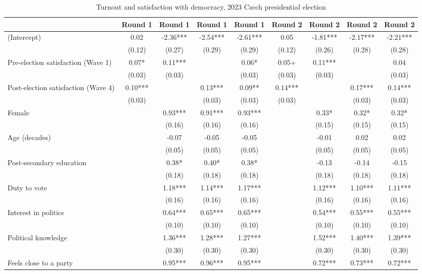 \begin{table}

\caption{\label{tab:unnamed-chunk-4}Turnout and satisfaction with democracy, 2023 Czech presidential election}
\centering
\begin{tabular}[t]{lcccccccc}
\toprule
  & Round 1 & Round 1  & Round 1   & Round 1    & Round 2 & Round 2  & Round 2   & Round 2   \\
\midrule
(Intercept) & 0.02 & -2.36*** & -2.54*** & -2.61*** & 0.05 & -1.81*** & -2.17*** & -2.21***\\
 & (0.12) & (0.27) & (0.29) & (0.29) & (0.12) & (0.26) & (0.28) & (0.28)\\
Pre-election satisfaction (Wave 1) & 0.07* & 0.11*** &  & 0.06* & 0.05+ & 0.11*** &  & 0.04\\
 & (0.03) & (0.03) &  & (0.03) & (0.03) & (0.03) &  & (0.03)\\
Post-election satisfaction (Wave 4) & 0.10*** &  & 0.13*** & 0.09** & 0.14*** &  & 0.17*** & 0.14***\\
 & (0.03) &  & (0.03) & (0.03) & (0.03) &  & (0.03) & (0.03)\\
Female &  & 0.93*** & 0.91*** & 0.93*** &  & 0.33* & 0.32* & 0.32*\\
 &  & (0.16) & (0.16) & (0.16) &  & (0.15) & (0.15) & (0.15)\\
Age (decades) &  & -0.07 & -0.05 & -0.05 &  & -0.01 & 0.02 & 0.02\\
 &  & (0.05) & (0.05) & (0.05) &  & (0.05) & (0.05) & (0.05)\\
Post-secondary education &  & 0.38* & 0.40* & 0.38* &  & -0.13 & -0.14 & -0.15\\
 &  & (0.18) & (0.18) & (0.18) &  & (0.18) & (0.18) & (0.18)\\
Duty to vote &  & 1.18*** & 1.14*** & 1.17*** &  & 1.12*** & 1.10*** & 1.11***\\
 &  & (0.16) & (0.16) & (0.16) &  & (0.16) & (0.16) & (0.16)\\
Interest in politics &  & 0.64*** & 0.65*** & 0.65*** &  & 0.54*** & 0.55*** & 0.55***\\
 &  & (0.10) & (0.10) & (0.10) &  & (0.10) & (0.10) & (0.10)\\
Political knowledge &  & 1.36*** & 1.28*** & 1.27*** &  & 1.52*** & 1.40*** & 1.39***\\
 &  & (0.30) & (0.30) & (0.30) &  & (0.30) & (0.30) & (0.30)\\
Feels close to a party &  & 0.95*** & 0.96*** & 0.95*** &  & 0.72*** & 0.73*** & 0.72***\\

\end{tabular}
\end{table}
